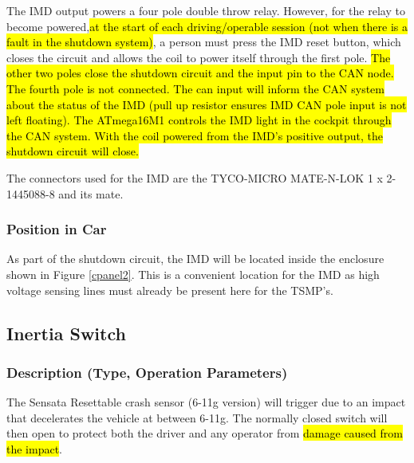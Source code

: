 \documentclass{article}
\DeclareRobustCommand{\hlr}[1]{{\sethlcolor{red}\hl{#1}}}
\begin{document}
            The IMD output powers a four pole double throw relay. However, for the relay to become powered,\hlr{at the start of each driving/operable session (not when there is a fault in the shutdown system)}, a person must press the IMD reset button, which closes the circuit and allows the coil to power itself through the first pole. \hlr{The other two poles close the shutdown circuit and the input pin to the CAN node. The fourth pole is not connected. The can input will inform the CAN system about the status of the IMD (pull up resistor ensures IMD CAN pole input is not left floating). The ATmega16M1 controls the IMD light in the cockpit through the CAN system. With the coil powered from the IMD's positive output, the shutdown circuit will close. }

            The connectors used for the IMD are the TYCO-MICRO MATE-N-LOK 1 x 2-1445088-8 and its mate.


        \subsubsection{Position in Car}

            As part of the shutdown circuit, the IMD will be located inside the enclosure shown in Figure \ref{cpanel2}. This is a convenient location for the IMD as high voltage sensing lines must already be present here for the TSMP's.

    \subsection{Inertia Switch}

        \subsubsection{Description (Type, Operation Parameters)}

            The Sensata Resettable crash sensor (6-11g version) will trigger due to an impact that decelerates the vehicle at between 6-11g. The normally closed switch will then open to protect both the driver and any operator from \hlr{damage caused from the impact}.
\end{document}
